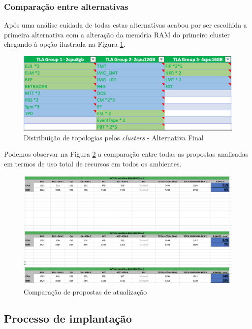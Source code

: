 \subsubsection{Comparação entre alternativas}

Após uma análise cuidada de todas estas alternativas acabou por ser escolhida a primeira alternativa
com a alteração da memória RAM do primeiro \gls{cluster} chegando à opção ilustrada na Figura
\ref{proposal-final}.

\begin{figure}[H]
  \centerline{\includegraphics[scale=0.6]{media/content/analise/proposal-final.png}}
  \caption{Distribuição de topologias pelos \textit{clusters} - Alternativa Final}
  \label{proposal-final}
\end{figure}

Podemos observar na Figura \ref{comparison-proposal} a comparação entre todas as propostas
analisadas em termos de uso total de recursos em todos os ambientes.

\begin{figure}[H]
  \centerline{\includegraphics[scale=0.4]{media/content/analise/proposal-comparison.png}}
  \caption{Comparação de propostas de atualização}
  \label{comparison-proposal}
\end{figure}

\subsection{Processo de implantação}

